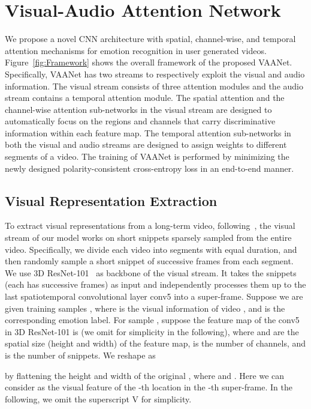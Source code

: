 \documentclass[letterpaper]{article} \usepackage{aaai20}  \usepackage{times}  \usepackage{helvet} \usepackage{courier}  \usepackage[hyphens]{url}  \usepackage{graphicx} \urlstyle{rm} \def\UrlFont{\rm}  \usepackage{graphicx}
\begin{document}
\section{Visual-Audio Attention Network}
\label{sec:VAANet}
We propose a novel CNN architecture with spatial, channel-wise, and temporal attention mechanisms for emotion recognition in user generated videos. Figure~\ref{fig:Framework} shows the overall framework of the proposed VAANet. Specifically, VAANet has two streams to respectively exploit the visual and audio information. The visual stream consists of three attention modules and the audio stream contains a temporal attention module. The spatial attention and the channel-wise attention sub-networks in the visual stream are designed to automatically focus on the regions and channels that carry discriminative information within each feature map. The temporal attention sub-networks in both the visual and audio streams are designed to assign weights to different segments of a video. The training of VAANet is performed by minimizing the newly designed polarity-consistent cross-entropy loss in an end-to-end manner.

\subsection{Visual Representation Extraction}
\label{ssec:Representation}

To extract visual representations from a long-term video, following~\cite{wang2016temporal}, the visual stream of our model works on short snippets sparsely sampled from the entire video. Specifically, we divide each video into  segments with equal duration, and then randomly sample a short snippet of  successive frames from each segment. We use 3D ResNet-101~\cite{hara2018can} as backbone of the visual stream. It takes the  snippets (each has  successive frames) as input and independently processes them up to the last spatiotemporal convolutional layer conv5 into a super-frame. Suppose we are given  training samples , where  is the visual information of video , and  is the corresponding emotion label.
For sample , suppose the feature map of the conv5 in 3D ResNet-101 is  (we omit  for simplicity in the following),  where  and  are the spatial size (height and width) of the feature map,  is the number of channels, and  is the number of snippets. We reshape  as

by flattening the height and width of the original , where  and . Here we can consider  as the visual feature of the -th location in the -th super-frame. In the following, we omit the superscript V for simplicity.
\end{document}
